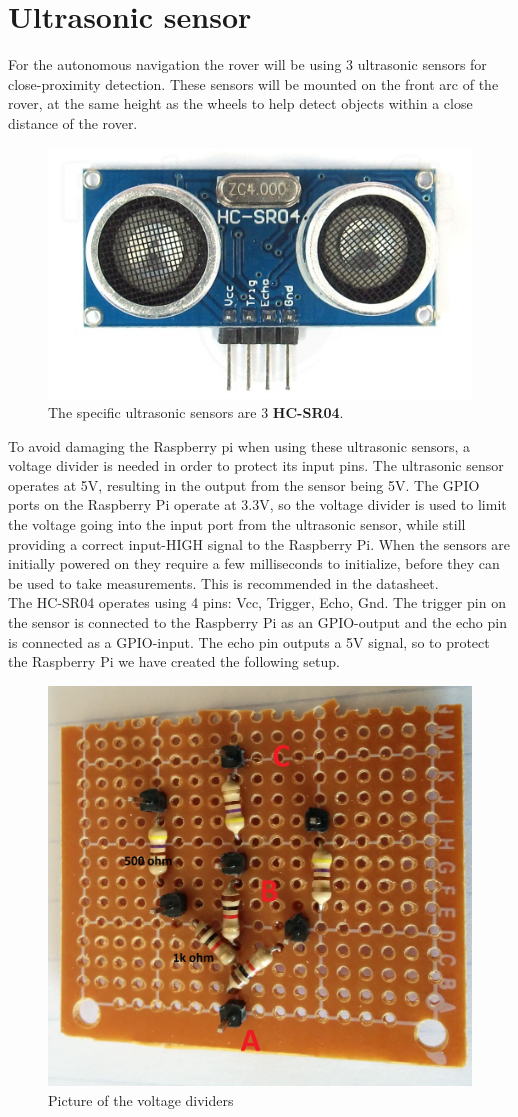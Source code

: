 \clearpage
\section{Ultrasonic sensor}

For the autonomous navigation the rover will be using 3 ultrasonic sensors for close-proximity detection. These sensors will be mounted on the front arc of the rover, at the same height as the wheels to help detect objects within a close distance of the rover.
\begin{figure}[H]
	\centering
	\includegraphics[width=.3\linewidth]{images/hcsr40.jpg}
	\caption{The specific ultrasonic sensors are 3 \textbf{HC-SR04}.}
	\label{ultrasonic_pic}
\end{figure}
To avoid damaging the Raspberry pi when using these ultrasonic sensors, a voltage divider is needed in order to protect its input pins. The ultrasonic sensor operates at 5V, resulting in the output from the sensor being 5V. The GPIO ports on the Raspberry Pi operate at 3.3V, so the voltage divider is used to limit the voltage going into the input port from the ultrasonic sensor, while still providing a correct input-HIGH signal to the Raspberry Pi.
When the sensors are initially powered on they require a few milliseconds to initialize, before they can be used to take measurements. This is recommended in the datasheet.\cite{hcsr40datesheet}\\
The HC-SR04 operates using 4 pins: Vcc, Trigger, Echo, Gnd.
The trigger pin on the sensor is connected to the Raspberry Pi as an GPIO-output and the echo pin is connected as a GPIO-input. The echo pin outputs a 5V signal, so to protect the Raspberry Pi we have created the following setup.
\begin{figure}[H]
	\centering
	\includegraphics[width=.3\linewidth]{images/vd_labelled.jpg}
	\caption{Picture of the voltage dividers}
	\label{voltagedividers}
\end{figure}
